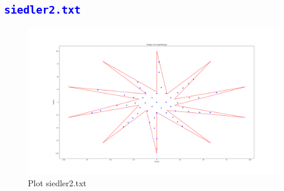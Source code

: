 \documentclass{article}
\begin{document}
\subsection{\textcolor{blue}{\texttt{siedler2.txt}}}
\begin{figure}[H]
    \centering
    \includegraphics[width=1\textwidth]{Bilder/Figure_2.png}
    \caption{Plot siedler2.txt}
\end{figure}
\end{document}
